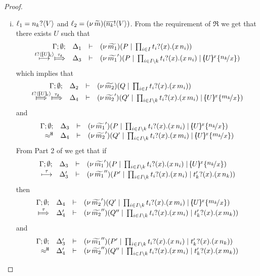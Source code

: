 \begin{proof}
\begin{enumerate}
\begin{enumerate}[i.]
					\item	$\ell_1 = n_k ? \langle V \rangle$ and $\ell_2 = (\nu\, \widetilde{m})(\overline{n_k} ! \langle V \rangle)$.
							From the requirement of $\Re$ we get that there exists $U$
							such that
							\[
								\mhorel{\Gamma}{\Delta_1}{ \newsp{\widetilde{m_1}}{P \Par \prod_{i \in I} \binp{t_i}{x} (\appl{x}{n_i})}}
								{ \hby{ \bactinp{t}{ \omapchar{U} }} \Hby{\dtau} }
								{\Delta_3}{}{  \newsp{\widetilde{m_1}'}{P \Par \prod_{i \in I\backslash{k}} \binp{t_i}{x} (\appl{x}{n_i})
								\Par  \mapchar{U}{x} \subst{n_k}{x} }}
							\]
							which implies that
							\[
								\mhorel{\Gamma}{\Delta_2}{ \newsp{\widetilde{m_2}}{Q \Par \prod_{i \in I} \binp{t_i}{x} (\appl{x}{m_i})}}
								{ \Hby{ \bactinp{t}{ \omapchar{U} }} \Hby{\dtau} }
								{\Delta_4}{}{  \newsp{\widetilde{m_2}'}{Q' \Par \prod_{i \in I\backslash{k}} \binp{t_i}{x} (\appl{x}{m_i})
								\Par  \mapchar{U}{x} \subst{m_k}{x} }}
							\]
							and
							\[
								\mhorel{\Gamma}{\Delta_3}{  \newsp{\widetilde{m_1}'}{P \Par \prod_{i \in I\backslash{k}} \binp{t_i}{x} (\appl{x}{n_i})
								\Par  \mapchar{U}{x} \subst{n_k}{x} }}
								{\hwb}
								{\Delta_4}{}{  \newsp{\widetilde{m_2}'}{Q' \Par \prod_{i \in I\backslash{k}} \binp{t_i}{x} (\appl{x}{m_i})
								\Par  \mapchar{U}{x} \subst{m_k}{x} }}
							\]
							From Part 2 of  we get that if 
							\[
								\mhorel{\Gamma}{\Delta_3}{  \newsp{\widetilde{m_1}'}{P \Par \prod_{i \in I\backslash{k}} \binp{t_i}{x} (\appl{x}{n_i})
								\Par  \mapchar{U}{x} \subst{n_k}{x} }}
								{ \hby{\tau} }
								{\Delta_3'}{}{  \newsp{\widetilde{m_1}''}{P' \Par \prod_{i \in I\backslash{k}} \binp{t_i}{x} (\appl{x}{n_i}) \Par
								\binp{t'_k}{x} (\appl{x}{n_k})}}
							\]
							then
							\begin{eqnarray*}
								\mhorel{\Gamma}{\Delta_4}{  \newsp{\widetilde{m_2}'}{Q' \Par \prod_{i \in I\backslash{k}} \binp{t_i}{x} (\appl{x}{m_i})
								\Par  \mapchar{U}{x} \subst{m_k}{x} }}
								{ \Hby{\tau} }
								{\Delta_4'}{}{  \newsp{\widetilde{m_2}''}{Q'' \Par \prod_{i \in I\backslash{k}} \binp{t_i}{x} (\appl{x}{m_i}) \Par
								\binp{t'_k}{x} (\appl{x}{m_k}) }}
							\end{eqnarray*}
							and
							\begin{eqnarray}
								\begin{array}{rcll} \Gamma; \emptyset; &\Delta_3'& \vdash&   (\nu\, \widetilde{m_1}'')(P' \;|\; \prod_{i \in I\backslash{k}} t_i ? (x) . (x\, {n_i}) \;|\;
								t'_k ? (x) . (x\, {n_k}))\\  \approx^\mathtt{H}  &\Delta_4'& \vdash &  (\nu\, \widetilde{m_2}'')(Q'' \;|\; \prod_{i \in I\backslash{k}} t_i ? (x) . (x\, {m_i}) \;|\; t'_k ? (x) . (x\, {m_k})) \end{array}
								\label{lem:tr_subst_41}
							\end{eqnarray}


\end{enumerate}
\end{enumerate}
\end{proof}
